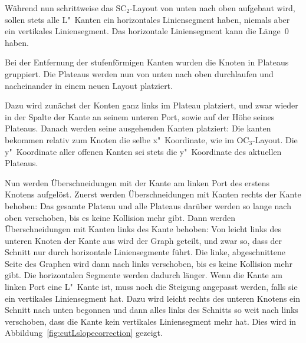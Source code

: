 \documentclass[a4paper]{scrreprt}
\theoremstyle{definition}
\begin{document}
Während nun schrittweise das SC$_2$-Layout von unten nach oben aufgebaut wird, sollen stets alle L"~Kanten ein horizontales Liniensegment haben, niemals aber ein vertikales Liniensegment. Das horizontale Liniensegment kann die Länge~0 haben. 


Bei der Entfernung der stufenförmigen Kanten wurden die Knoten in Plateaus gruppiert. Die Plateaus werden nun von unten nach oben durchlaufen und nacheinander in einem neuen Layout platziert.

Dazu wird zunächst der Konten ganz links im Plateau platziert, und zwar wieder in der Spalte der Kante an seinem unteren Port, sowie auf der Höhe seines Plateaus. Danach werden seine ausgehenden Kanten platziert: Die kanten bekommen relativ zum Knoten die selbe x"~Koordinate, wie im OC$_3$-Layout. Die y"~Koordinate aller offenen Kanten sei stets die y"~Koordinate des aktuellen Plateaus. 

Nun werden Überschneidungen mit der Kante am linken Port des erstens Knotens aufgelöst. Zuerst werden Überschneidungen mit Kanten rechts der Kante behoben: Das gesamte Plateau und alle Plateaus darüber werden so lange nach oben verschoben, bis es keine Kollision mehr gibt. Dann werden Überschneidungen mit Kanten links des Kante behoben: Von leicht links des unteren Knoten der Kante aus wird der Graph geteilt, und zwar so, dass der Schnitt nur durch horizontale Liniensegmente führt. Die linke, abgeschnittene Seite des Graphen wird dann nach links verschoben, bis es keine Kollision mehr gibt. Die horizontalen Segmente werden dadurch länger. Wenn die Kante am linken Port eine L"~Kante ist, muss noch die Steigung angepasst werden, falls sie ein vertikales Liniensegment hat. Dazu wird leicht rechts des unteren Knotens ein Schnitt nach unten begonnen und dann alles links des Schnitts so weit nach links verschoben, dass die Kante kein vertikales Liniensegment mehr hat. Dies wird in Abbildung~\ref{fig:cutLslopecorrection} gezeigt.
\end{document}
